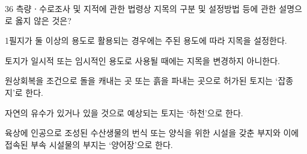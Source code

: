 \begin{question}{36}
측량ㆍ수로조사 및 지적에 관한 법령상 지목의 구분 및 설정방법 등에 관한 설명으로 옳지 않은 것은?
\begin{choices}
  \item 1필지가 둘 이상의 용도로 활용되는 경우에는 주된 용도에 따라 지목을 설정한다.
  \item 토지가 일시적 또는 임시적인 용도로 사용될 때에는 지목을 변경하지 아니한다.
  \item 원상회복을 조건으로 돌을 캐내는 곳 또는 흙을 파내는 곳으로 허가된 토지는 ‘잡종지’로 한다.
  \item 자연의 유수가 있거나 있을 것으로 예상되는 토지는 ‘하천’으로 한다.
  \item 육상에 인공으로 조성된 수산생물의 번식 또는 양식을 위한 시설을 갖춘 부지와 이에 접속된 부속 시설물의 부지는 ‘양어장’으로 한다.
\end{choices}
\end{question}
